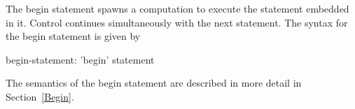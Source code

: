 The begin statement spawns a computation to execute the statement
embedded in it.  Control continues simultaneously with the next
statement.  The syntax for the begin statement is given by
\begin{syntax}
begin-statement:
  'begin' statement
\end{syntax}

The semantics of the begin statement are described in more detail in
Section~\ref{Begin}.

